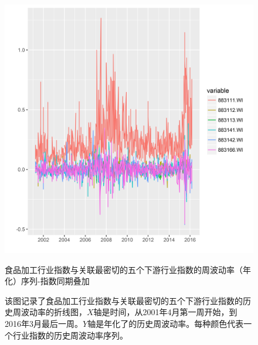 \documentclass{sysuthesis}
\begin{document}
\begin{figure}[htbp]
\centering
\includegraphics[scale=0.8]{image/883111-topk-lower-plus-one-weeklyvol-combined.png}
\caption{食品加工行业指数与关联最密切的五个下游行业指数的周波动率（年化）序列-指数同期叠加}
\caption*{\footnotesize 该图记录了食品加工行业指数与关联最密切的五个下游行业指数的历史周波动率的折线图，$X$轴是时间，从2001年4月第一周开始，到2016年3月最后一周。$Y$轴是年化了的历史周波动率。每种颜色代表一个行业指数的历史周波动率序列。}
\label{fig:883111-topk-lower-plus-one-weeklyvol-combined}
\end{figure}

\backmatter
\end{document}
